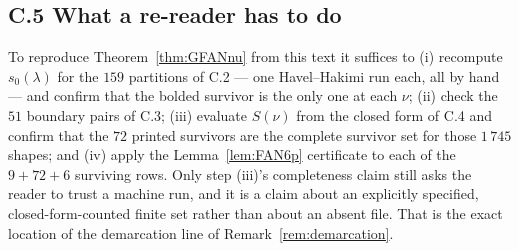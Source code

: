 \subsection*{C.5 What a re-reader has to do}

To reproduce Theorem~\ref{thm:GFANnu} from this text it suffices to (i) recompute
$s_0(\lambda)$ for the $159$ partitions of C.2 --- one Havel--Hakimi run each, all by hand
--- and confirm that the bolded survivor is the only one at each $\nu$; (ii) check the $51$
boundary pairs of C.3; (iii) evaluate $S(\nu)$ from the closed form of C.4 and confirm that
the $72$ printed survivors are the complete survivor set for those $1\,745$ shapes; and
(iv) apply the Lemma~\ref{lem:FAN6p} certificate to each of the $9 + 72 + 6$ surviving rows.
Only step (iii)'s completeness claim still asks the reader to trust a machine run, and it is
a claim about an explicitly specified, closed-form-counted finite set rather than about an
absent file. That is the exact location of the demarcation line of
Remark~\ref{rem:demarcation}.

